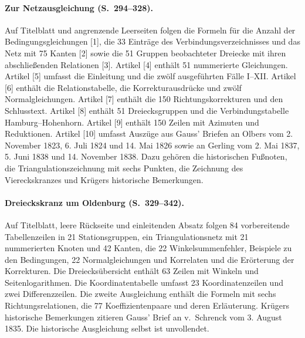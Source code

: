 \paragraph{Zur Netzausgleichung (S.~294--328).}
Auf Titelblatt und angrenzende Leerseiten folgen die Formeln für die Anzahl der Bedingungsgleichungen [1], die 33 Einträge des Verbindungsverzeichnisses und das Netz mit 75 Kanten [2] sowie die 51 Gruppen beobachteter Dreiecke mit ihren abschließenden Relationen [3]. Artikel [4] enthält 51 nummerierte Gleichungen. Artikel [5] umfasst die Einleitung und die zwölf ausgeführten Fälle I--XII. Artikel [6] enthält die Relationstabelle, die Korrekturausdrücke und zwölf Normalgleichungen. Artikel [7] enthält die 150 Richtungskorrekturen und den Schlusstext. Artikel [8] enthält 51 Dreiecksgruppen und die Verbindungstabelle Hamburg--Hohenhorn. Artikel [9] enthält 150 Zeilen mit Azimuten und Reduktionen. Artikel [10] umfasst Auszüge aus Gauss' Briefen an Olbers vom 2. November 1823, 6. Juli 1824 und 14. Mai 1826 sowie an Gerling vom 2. Mai 1837, 5. Juni 1838 und 14. November 1838. Dazu gehören die historischen Fußnoten, die Triangulationszeichnung mit sechs Punkten, die Zeichnung des Viereckskranzes und Krügers historische Bemerkungen.

\paragraph{Dreieckskranz um Oldenburg (S.~329--342).}
Auf Titelblatt, leere Rückseite und einleitenden Absatz folgen 84 vorbereitende Tabellenzeilen in 21 Stationsgruppen, ein Triangulationsnetz mit 21 nummerierten Knoten und 42 Kanten, die 22 Winkelsummenfehler, Beispiele zu den Bedingungen, 22 Normalgleichungen und Korrelaten und die Erörterung der Korrekturen. Die Dreiecksübersicht enthält 63 Zeilen mit Winkeln und Seitenlogarithmen. Die Koordinatentabelle umfasst 23 Koordinatenzeilen und zwei Differenzzeilen. Die zweite Ausgleichung enthält die Formeln mit sechs Richtungsrelationen, die 77 Koeffizientenpaare und deren Erläuterung. Krügers historische Bemerkungen zitieren Gauss' Brief an v.~Schrenck vom 3. August 1835. Die historische Ausgleichung selbst ist unvollendet.

